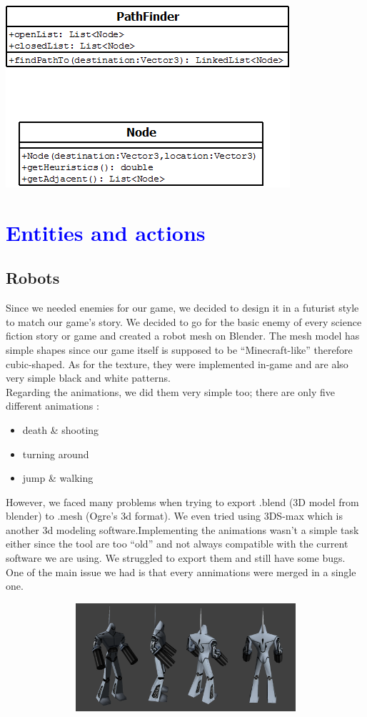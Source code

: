 \documentclass[article]{report}             %
\begin{document}
				\begin{center}
					\includegraphics{images/Astar.png}
				\end{center}

		\chapter{\textcolor{blue}{Entities and actions}}
			\section{Robots}
				Since we needed enemies for our game, we decided to design it in a futurist style to match our game's story. We decided to go for the basic enemy of every science fiction story or game and created a robot mesh on Blender. The mesh model has simple shapes since our game itself is supposed to be ``Minecraft-like'' therefore cubic-shaped. As for the texture, they were implemented in-game and are also very simple black and white patterns.\\

				Regarding the animations, we did them very simple too; there are only five different animations :
				\begin{itemize}
					\item death \& shooting
					\item turning around
					\item jump \& walking
				\end{itemize}

				However, we faced many problems when trying to export .blend (3D model from blender) to .mesh (Ogre's 3d format). We even tried using 3DS-max which is another 3d modeling software.Implementing the animations wasn't a simple task either since the tool are too ``old'' and not always compatible with the current software we are using. We struggled to export them and still have some bugs. One of the main issue we had is that every annimations were merged in a single one.
				\begin{center}
					\includegraphics[width = 15cm, height = 4cm]{images/robotMesh2.png}
				\end{center}
\end{document}
